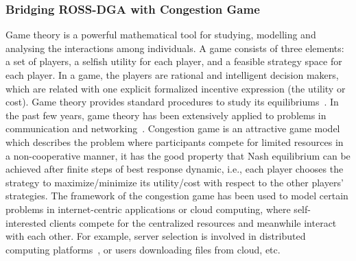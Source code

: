 \documentclass[10pt,journal,compsoc]{IEEEtran}
\theoremstyle{mytheoremstyle}
\theoremstyle{mytheoremstyle}
\theoremstyle{mytheoremstyle}
\newcommand{\ie}{i.e., }
\begin{document}
\subsubsection{Bridging ROSS-DGA with Congestion Game}
\label{clustering:phaseII:game}
Game theory is a powerful mathematical tool for studying, modelling and analysing the interactions among individuals.
A game consists of three elements: a set of players, a selfish utility for each player, and a feasible strategy space for each player. In a game, the players are rational and intelligent decision makers, which are related with one explicit formalized incentive expression (the utility or cost).
Game theory provides standard procedures to study its equilibriums~\cite{game_for_communication_01}.
In the past few years, game theory has been extensively applied to problems in communication and networking~\cite{Neel06analysisand, Wang_gtc_crn_survey_2010}.
Congestion game is an attractive game model which describes the problem where participants compete for limited resources in a non-cooperative manner, it has the good property that Nash equilibrium can be achieved after finite steps of best response dynamic, \ie each player chooses the strategy to maximize/minimize its utility/cost with respect to the other players' strategies.
The framework of the congestion game has been used to model certain problems in internet-centric applications or cloud computing, where self-interested clients compete for the centralized resources and meanwhile interact with each other.
For example, server selection is involved in distributed computing platforms~\cite{Cloud_Computing_2010}, or users downloading files from cloud, etc.
\end{document}
